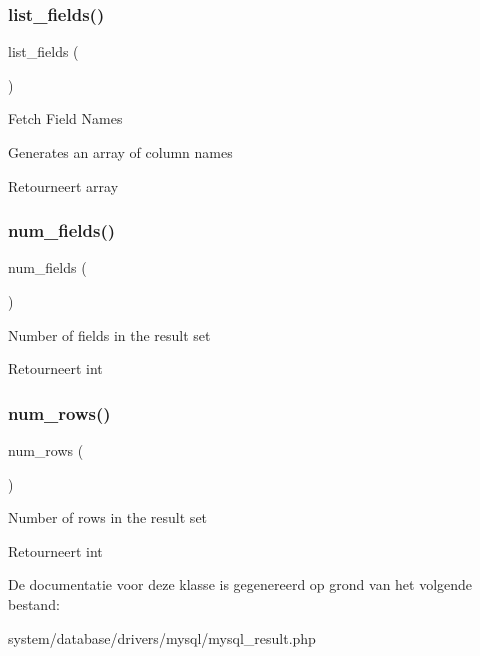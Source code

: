 \subsubsection{\texorpdfstring{list\_fields()}{list\_fields()}}
{\footnotesize\ttfamily list\+\_\+fields (\begin{DoxyParamCaption}{ }\end{DoxyParamCaption})}

Fetch Field Names

Generates an array of column names

\begin{DoxyReturn}{Retourneert}
array 
\end{DoxyReturn}
\mbox{\label{class_c_i___d_b__mysql__result_af831bf363e4d7d661a717a4932af449d}} 
\subsubsection{\texorpdfstring{num\_fields()}{num\_fields()}}
{\footnotesize\ttfamily num\+\_\+fields (\begin{DoxyParamCaption}{ }\end{DoxyParamCaption})}

Number of fields in the result set

\begin{DoxyReturn}{Retourneert}
int 
\end{DoxyReturn}
\mbox{\label{class_c_i___d_b__mysql__result_a218657c303ee499b97710ab0cd2f5d6e}} 
\subsubsection{\texorpdfstring{num\_rows()}{num\_rows()}}
{\footnotesize\ttfamily num\+\_\+rows (\begin{DoxyParamCaption}{ }\end{DoxyParamCaption})}

Number of rows in the result set

\begin{DoxyReturn}{Retourneert}
int 
\end{DoxyReturn}


De documentatie voor deze klasse is gegenereerd op grond van het volgende bestand\+:\begin{DoxyCompactItemize}
\item 
system/database/drivers/mysql/mysql\+\_\+result.\+php\end{DoxyCompactItemize}
